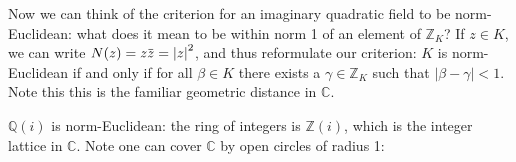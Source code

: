 \begin{remark}
\begin{figure}
{\begin{tikzpicture}
\end{tikzpicture}
}
\end{figure}

Now we can think of the criterion for an imaginary quadratic field to be
norm-Euclidean: what does it mean to be within norm 1 of an element of
\({\mathbb{Z}}_K\)? If \(z\in K\), we can write
\(N(z) = z \mkern 1.5mu\overline{\mkern-1.5muz\mkern-1.5mu}\mkern 1.5mu = {\left\lvert {z} \right\rvert}^2\),
and thus reformulate our criterion: \(K\) is norm-Euclidean if and only
if for all \(\beta\in K\) there exists a \(\gamma\in {\mathbb{Z}}_K\)
such that \({\left\lvert {\beta- \gamma} \right\rvert}<1\). Note this
this is the familiar geometric distance in \({\mathbb{C}}\).

\end{remark}

\begin{example}[?]

\({\mathbb{Q}}(i)\) is norm-Euclidean: the ring of integers is
\({\mathbb{Z}}(i)\), which is the integer lattice in \({\mathbb{C}}\).
Note one can cover \({\mathbb{C}}\) by open circles of radius 1:

\begin{figure}
\centering
{}
\end{figure}


\end{example}
